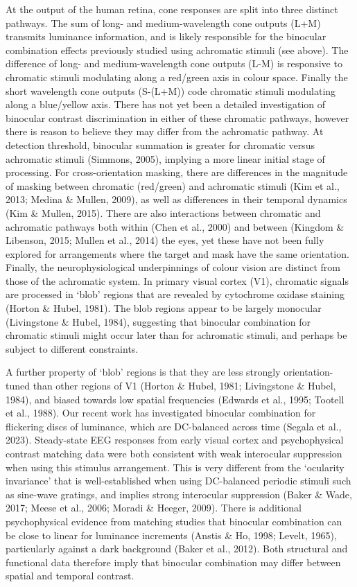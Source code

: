 \documentclass[
  letterpaper,
  DIV=11,
  numbers=noendperiod]{scrartcl}
\begin{document}
At the output of the human retina, cone responses are split into three
distinct pathways. The sum of long- and medium-wavelength cone outputs
(L+M) transmits luminance information, and is likely responsible for the
binocular combination effects previously studied using achromatic
stimuli (see above). The difference of long- and medium-wavelength cone
outputs (L-M) is responsive to chromatic stimuli modulating along a
red/green axis in colour space. Finally the short wavelength cone
outputs (S-(L+M)) code chromatic stimuli modulating along a blue/yellow
axis. There has not yet been a detailed investigation of binocular
contrast discrimination in either of these chromatic pathways, however
there is reason to believe they may differ from the achromatic pathway.
At detection threshold, binocular summation is greater for chromatic
versus achromatic stimuli (Simmons, 2005), implying a more linear
initial stage of processing. For cross-orientation masking, there are
differences in the magnitude of masking between chromatic (red/green)
and achromatic stimuli (Kim et al., 2013; Medina \& Mullen, 2009), as
well as differences in their temporal dynamics (Kim \& Mullen, 2015).
There are also interactions between chromatic and achromatic pathways
both within (Chen et al., 2000) and between (Kingdom \& Libenson, 2015;
Mullen et al., 2014) the eyes, yet these have not been fully explored
for arrangements where the target and mask have the same orientation.
Finally, the neurophysiological underpinnings of colour vision are
distinct from those of the achromatic system. In primary visual cortex
(V1), chromatic signals are processed in `blob' regions that are
revealed by cytochrome oxidase staining (Horton \& Hubel, 1981). The
blob regions appear to be largely monocular (Livingstone \& Hubel,
1984), suggesting that binocular combination for chromatic stimuli might
occur later than for achromatic stimuli, and perhaps be subject to
different constraints.

A further property of `blob' regions is that they are less strongly
orientation-tuned than other regions of V1 (Horton \& Hubel, 1981;
Livingstone \& Hubel, 1984), and biased towards low spatial frequencies
(Edwards et al., 1995; Tootell et al., 1988). Our recent work has
investigated binocular combination for flickering discs of luminance,
which are DC-balanced across time (Segala et al., 2023). Steady-state
EEG responses from early visual cortex and psychophysical contrast
matching data were both consistent with weak interocular suppression
when using this stimulus arrangement. This is very different from the
`ocularity invariance' that is well-established when using DC-balanced
periodic stimuli such as sine-wave gratings, and implies strong
interocular suppression (Baker \& Wade, 2017; Meese et al., 2006; Moradi
\& Heeger, 2009). There is additional psychophysical evidence from
matching studies that binocular combination can be close to linear for
luminance increments (Anstis \& Ho, 1998; Levelt, 1965), particularly
against a dark background (Baker et al., 2012). Both structural and
functional data therefore imply that binocular combination may differ
between spatial and temporal contrast.
\end{document}
